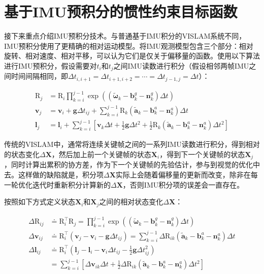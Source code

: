 \section{基于IMU预积分的惯性约束目标函数}

接下来重点介绍IMU预积分技术\citep{forster2017manifold}。与普通基于IMU积分的VISLAM系统不同，IMU预积分使用了更精确的相对运动模型。将IMU观测模型包含三个部分：相对旋转、相对速度、相对平移，可以认为它们是仅关于偏移量的函数。使用以下算法进行IMU预积分，假设需要对$t_i$和$t_j$之间IMU读数进行积分（假设相邻两帧IMU之间时间间隔相同，即$\Delta t_{i,i+1} = \Delta t_{i+1,i+2} = \cdots = \Delta t_{j-1,j} = \Delta t$）：

\begin{equation}
\begin{aligned}
\mathrm{R}_j &= \mathrm{R}_i \prod_{k=i}^{j-1}
                \exp\left(
                    (\tilde{\bm\omega}_k - \bm{b}_k^g - \bm{n}_k^g) \Delta t
                \right) \\
\bm{v}_j &= \bm{v}_i + \bm{g} \Delta t_{ij} + \sum_{k=i}^{j-1}
\mathrm{R}_k (\tilde{\bm{a}}_k - \bm{b}_k^a - \bm{n}_k^a) \Delta t \\
\bm{l}_j &= \bm{l}_i + \sum_{k=i}^{j-1}
                \left[
                    \bm{v}_k \Delta t +
                    \tfrac{1}{2}\bm{g}\Delta t^2 +
                    \tfrac{1}{2}\mathrm{R}_k
                    (\tilde{\bm a}_k - \bm{b}_k^a - \bm{n}_k^a) \Delta t^2
                \right]
    \end{aligned}
\end{equation}

传统的VISLAM中，通常将连续关键帧之间的一系列IMU读数进行积分，得到相对的状态变化$\Delta\bm X$，然后加上前一个关键帧的状态$\bm{X}_i$，得到下一个关键帧的状态$\bm{X}_j$，同时计算出累积的协方差，作为下一个关键帧的先验估计，参与到视觉的优化中去。这样做的缺陷就是，积分项$\Delta\bm X$实际上会随着偏移量的更新而改变，除非在每一轮优化迭代时重新积分计算新的$\Delta\bm X$，否则IMU积分项的误差会一直存在。

按照如下方式定义状态$\bm{X}_i$和$\bm{X}_j$之间的相对状态变化$\Delta\bm X$：

\begin{equation}
\begin{aligned}
    \Delta\mathrm{R}_{ij}
  &\doteq \mathrm{R}_i^\top \mathrm{R}_j
  = \prod_{k=i}^{j-1}
  \exp\left(
      (\tilde{\bm \omega}_k - \bm{b}_k^g - \bm{n}_k^g) \Delta t
  \right) \\
  \Delta\bm{v}_{ij}
  &\doteq \mathrm{R}_i^\top (\bm{v}_j - \bm{v}_i - \bm{g} \Delta t_{ij})
  = \sum_{k=i}^{j-1}
  \Delta\mathrm{R}_{ik}
  (\tilde{\bm a}_k - \bm{b}_k^a - \bm{n}_k^a) \Delta t \\
  \Delta\bm{l}_{ij}
  &\doteq \mathrm{R}_i^\top
  \left(
      \bm{l}_j - \bm{l}_i -
      \bm{v}_i \Delta t_{ij} -
      \tfrac{1}{2} \bm{g} \Delta t_{ij}^2
  \right) \\
  &=           \sum_{k=i}^{j-1}
  \left[
      \Delta\bm{v}_{ik} \Delta t +
      \tfrac{1}{2} \Delta\mathrm{R}_{ik}
      (\tilde{\bm a}_k - \bm{b}_k^a - \bm{n}_k^a) \Delta t^2
  \right]
\end{aligned}\label{eq:raw_int}
\end{equation}

